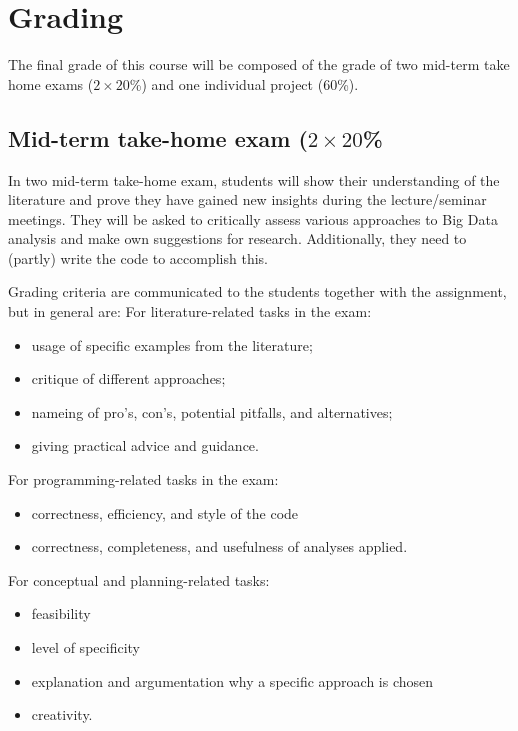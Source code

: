 \documentclass[a4paper,12pt]{report}
\begin{document}
\section*{Grading}

The final grade of this course will be composed of the grade of two mid-term take home exams ($2 \times 20$\%) and one individual project (60\%).

\subsection*{Mid-term take-home exam ($2 \times 20$\%}
In two mid-term take-home exam, students will show their understanding of the literature and prove they have gained new insights during the lecture/seminar meetings. They will be asked to critically assess various approaches to Big Data analysis and make own suggestions for research. Additionally, they need to (partly) write the code to accomplish this.

Grading criteria are communicated to the students together with the assignment, but in general are:
For literature-related tasks in the exam:
\begin{itemize}
	\item usage of specific examples from the literature;
	\item critique of different approaches;
	\item nameing of pro's, con's, potential pitfalls, and alternatives;
	\item giving practical advice and guidance.
\end{itemize}
For programming-related tasks in the exam:
\begin{itemize}
	\item correctness, efficiency, and style of the code
	\item correctness, completeness, and usefulness of analyses applied.
\end{itemize}
For conceptual and planning-related tasks:
\begin{itemize}
	\item feasibility
	\item level of specificity
	\item explanation and argumentation why a specific approach is chosen
	\item creativity.
\end{itemize}
\end{document}

